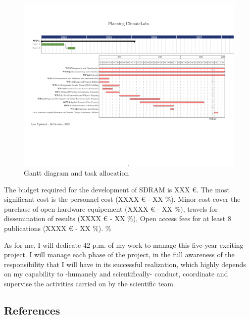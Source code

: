 \documentclass[
  12pt,
  a4paperpaper,
  onecolumn]{article}
\begin{document}
\begin{figure}
\centering
    \includegraphics[width=0.9\linewidth]{Gantt/Gantt-B1.pdf}
    \caption{Gantt diagram and task allocation}
    \label{fig:gantt-b1}
\end{figure}

The budget required for the development of SDRAM is XXX €. The most
significant cost is the personnel cost (XXXX € - XX \%). Minor cost
cover the purchase of open hardware equipement (XXXX € - XX \%), travels
for dissemination of results (XXXX € - XX \%), Open access fees for at
least 8 publications (XXXX € - XX \%). \%

As for me, I will dedicate 42 p.m. of my work to manage this five-year
exciting project. I will manage each phase of the project, in the full
awareness of the responsibility that I will have in its successful
realization, which highly depends on my capability to -humanely and
scientifically- conduct, coordinate and supervise the activities carried
on by the scientific team.

\newpage

\hypertarget{references}{%
\subsection*{References}\label{references}}
\end{document}
